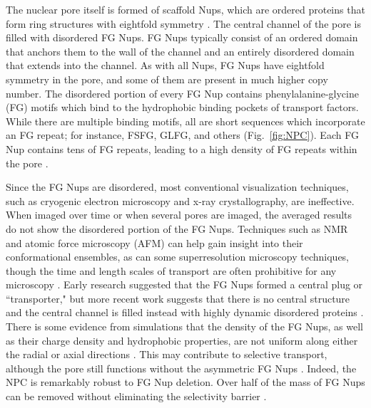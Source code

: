 The nuclear pore itself is formed of scaffold Nups, which are ordered proteins that form ring structures with eightfold symmetry \cite{beck17,strambio-de-castillia10}.  The central channel of the pore is filled with disordered FG Nups.  FG Nups typically consist of an ordered domain that anchors them to the wall of the channel and an entirely disordered domain that extends into the channel.  As with all Nups, FG Nups have eightfold symmetry in the pore, and some of them are present in much higher copy number. The disordered portion of every FG Nup contains phenylalanine-glycine (FG) motifs which bind to the hydrophobic binding pockets of transport factors.  While there are multiple binding motifs, all are short sequences which incorporate an FG repeat; for instance, FSFG, GLFG, and others (Fig.~\ref{fig:NPC}).  Each FG Nup contains tens of FG repeats, leading to a high density of FG repeats within the pore \cite{strambio-de-castillia10,terry09}.

Since the FG Nups are disordered, most conventional visualization techniques, such as cryogenic electron microscopy and x-ray crystallography, are ineffective.  When imaged over time or when several pores are imaged, the averaged results do not show the disordered portion of the FG Nups. Techniques such as NMR and atomic force microscopy (AFM) can help gain insight into their conformational ensembles, as can some superresolution microscopy techniques, though the time and length scales of transport are often prohibitive for any microscopy \cite{hough15,sakiyama16,tu11}.  Early research suggested that the FG Nups formed a central plug or ``transporter," but more recent work suggests that there is no central structure and the central channel is filled instead with highly dynamic disordered proteins \cite{moussavi-baygi16,schoch12,sakiyama16}. There is some evidence from simulations that the density of the FG Nups, as well as their charge density and hydrophobic properties, are not uniform along either the radial or axial directions \cite{yamada10,ando14,tagliazucchi13}.  This may contribute to selective transport, although the pore still functions without the asymmetric FG Nups \cite{zeitler04}.  Indeed, the NPC is remarkably robust to FG Nup deletion.  Over half of the mass of FG Nups can be removed without eliminating the selectivity barrier \cite{strawn04, zeitler04,kowalczyk11, jovanovic-talisman09}.

